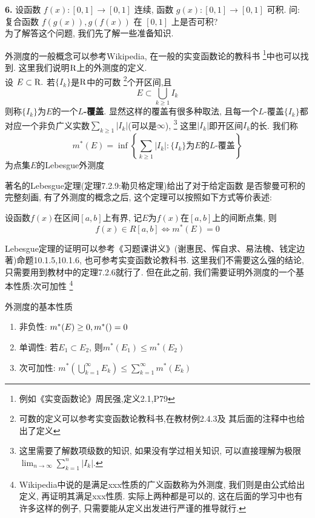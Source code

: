 \documentclass[a4paper,12pt]{article}
\begin{document}
\noindent \textbf{6.} 设函数 $f(x):[0,1]\to [0,1]$ 连续, 函数 $g(x):[0,1]\to [0,1]$ 可积. 
问: 复合函数 $f(g(x)),g(f(x))$ 在 $[0,1]$ 上是否可积?\\

为了解答这个问题, 我们先了解一些准备知识.
\begin{definition}[外测度]
  外测度的一般概念可以参考Wikipedia, 在一般的实变函数论的教科书
  \footnote{例如《实变函数论》周民强,定义2.1,P79}中也可以找到. 
  这里我们说明$\mathrm{R}$上的外测度的定义. \\
  设 $E\subset \mathrm{R}.$ 若$\{I_k\}$是$\mathrm{R}$中的可数
  \footnote{可数的定义可以参考实变函数论教科书,在教材例2.4.3及
  其后面的注释中也给出了定义}个开区间,且
  \[E\subset\bigcup_{k\geq1}I_k\]
  则称$\{I_k\}$为$E$的一个\textbf{$L$-覆盖}. 显然这样的覆盖有很多种取法, 
  且每一个$L$-覆盖$\{I_k\}$都对应一个非负广义实数$\sum_{k\geq1}|I_k|$(可以是$\infty$), 
  \footnote{这里需要了解数项级数的知识, 如果没有学过相关知识, 
  可以直接理解为极限$\lim_{n\to\infty}\sum_{k=1}^{n}|I_k|$.}
  这里$|I_k|$即开区间$I_k$的长. 我们称
  \[m^*(E)=\inf\left\{\sum_{k\geq1}|I_k|:\{I_k\}\text{为}E\text{的}L\text{-覆盖}\right\}\]
  为点集$E$的Lebesgue外测度
\end{definition}
著名的Lebesgue定理(定理7.2.9:勒贝格定理)给出了对于给定函数
是否黎曼可积的完整刻画, 有了外测度的概念之后, 这个定理可以按照如下方式等价表述:
\begin{theorem}[Lebesgue定理]
  设函数$f(x)$在区间$[a,b]$上有界, 记$E$为$f(x)$在$[a,b]$上的间断点集, 则
  \[f(x)\in R[a,b]\Leftrightarrow m^*(E)=0\]
\end{theorem}
Lebesgue定理的证明可以参考《习题课讲义》(谢惠民、恽自求、易法槐、钱定边著)命题10.1.5,10.1.6, 
也可参考实变函数论教科书. 这里我们不需要这么强的结论, 只需要用到教材中的定理7.2.6就行了.
但在此之前, 我们需要证明外测度的一个基本性质:次可加性
\footnote{Wikipedia中说的是满足xxx性质的广义函数称为外测度, 我们则是由公式给出定义, 再证明其满足xxx性质.
实际上两种都是可以的, 这在后面的学习中也有许多这样的例子, 只需要能从定义出发进行严谨的推导就行.}
\begin{lemma}外测度的基本性质
  \begin{enumerate}
    \item 非负性: $m^*(E)\geq0,m^*(\empty)=0$
    \item 单调性: 若$E_1\subset E_2$, 则$m^*(E_1)\leq m^*(E_2)$
    \item 次可加性: $m^*(\bigcup_{k=1}^\infty E_k)\leq \sum_{k=1}^{\infty}m^*(E_k)$
  \end{enumerate}
\end{lemma}
\end{document}
